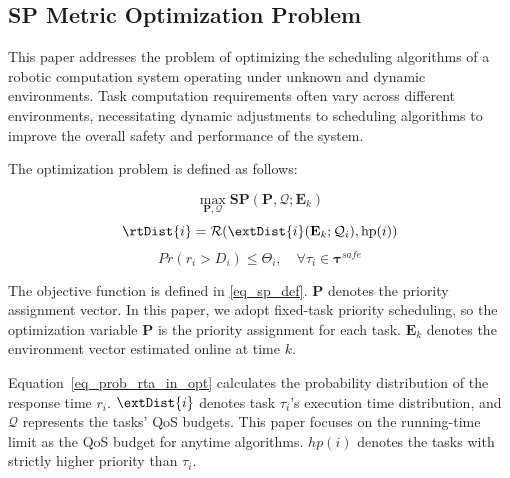 	\subsection{SP Metric Optimization Problem}
    This paper addresses the problem of optimizing the scheduling algorithms of a robotic computation system operating under unknown and dynamic environments.
    Task computation requirements often vary across different environments, necessitating dynamic adjustments to scheduling algorithms to improve the overall safety and performance of the system.


    The optimization problem is defined as follows:

	\begin{equation}
		\max_{\boldsymbol{P}, \boldsymbol{\mathcal{Q}}}  \textbf{SP}(\boldsymbol{P}, \boldsymbol{\mathcal{Q}}; \textbf{E}_k)
		\label{eq_overall_obj}
	\end{equation}
	\begin{equation}
		\rtDist{i} = \mathcal{R}(\extDist{i}(\textbf{E}_k;\mathcal{Q}_i), \text{hp}(i))
		\label{eq_prob_rta_in_opt}
	\end{equation}
	\begin{equation}
		Pr(r_i > D_i) \leq \Theta_i, \quad \forall \tau_i \in \boldsymbol{\tau}^{safe}
		\label{eq_important_task_constraint}
	\end{equation}

        The objective function is defined in \eqref{eq_sp_def}.
        $\boldsymbol{P}$ denotes the priority assignment vector.
        In this paper, we adopt fixed-task priority scheduling, so the optimization variable $\boldsymbol{P}$ is the priority assignment for each task.
        $\textbf{E}_k$ denotes the environment vector estimated online at time $k$.

        Equation~\eqref{eq_prob_rta_in_opt} calculates the probability distribution of the response time $r_i$.
        $\extDist{i}$ denotes task $\tau_i$'s execution time distribution, and $\boldsymbol{\mathcal{Q}}$ represents the tasks' QoS budgets.
        This paper focuses on the running-time limit as the QoS budget for anytime algorithms.
        $hp(i)$ denotes the tasks with strictly higher priority than $\tau_i$.

